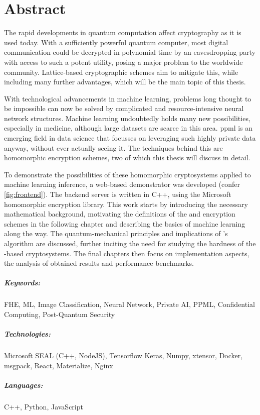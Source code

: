 \chapter*{Abstract}
The rapid developments in quantum computation affect cryptography as it is used today.
With a sufficiently powerful quantum computer, most digital communication could be decrypted in polynomial time by an eavesdropping party with access to such a potent utility, posing a major problem to the worldwide community.
Lattice-based cryptographic schemes aim to mitigate this, while including many further advantages, which will be the main topic of this thesis.

With technological advancements in machine learning, problems long thought to be impossible can now be solved by complicated and resource-intensive neural network structures.
Machine learning undoubtedly holds many new possibilities, especially in medicine, although large datasets are scarce in this area.
\Gls{ppml} is an emerging field in data science that focusses on leveraging such highly private data anyway, without ever actually seeing it.
The techniques behind this are homomorphic encryption schemes, two of which this thesis will discuss in detail.

To demonstrate the possibilities of these homomorphic cryptosystems applied to machine learning inference, a web-based demonstrator was developed (confer \cref{fig:frontend}).
The backend server is written in C++, using the Microsoft  homomorphic encryption library.
This work starts by introducing the necessary mathematical background, motivating the definitions of the  and  encryption schemes in the following chapter and describing the basics of machine learning along the way.
The quantum-mechanical principles and implications of 's algorithm are discussed, further inciting the need for studying the hardness of the -based cryptosystems.
The final chapters then focus on implementation aspects, the analysis of obtained results and performance benchmarks.

\paragraph{Keywords:}
FHE, ML, Image Classification, Neural Network,
Private AI, PPML, Confidential Computing,
Post-Quantum Security

\paragraph{Technologies:}
Microsoft SEAL (C++, NodeJS),
Tensorflow Keras,
Numpy,
xtensor,
Docker,
msgpack,
React,
Materialize,
Nginx

\paragraph{Languages:}
C++, Python, JavaScript
